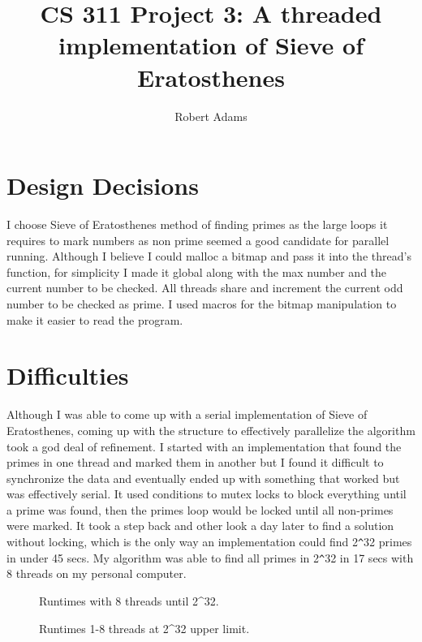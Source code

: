 \documentclass[letterpaper,10pt]{article} %
\begin{document}
  \title{CS 311 Project 3: A threaded implementation of Sieve of Eratosthenes}
  \author{Robert Adams}
\maketitle


\section{Design Decisions}


I choose Sieve of Eratosthenes method of finding primes as the large loops it requires to mark numbers as non prime seemed a good candidate for parallel running.
 Although I believe I could malloc a bitmap and pass it into the thread's function, for simplicity I made it global along with the max number and the current number to be checked.
  All threads share and increment the current odd number to be checked as prime. I used macros for the bitmap manipulation to make it easier to read the program.


\section{Difficulties}


Although I was able to come up with a serial implementation of Sieve of Eratosthenes, coming up with the structure to effectively parallelize the algorithm took a god deal of refinement.  
I started with an implementation that found the primes in one thread and marked them in another but I found it difficult to synchronize the data and eventually ended up with something that worked but was effectively serial.  
It used conditions to mutex locks to block everything until a prime was found, then the primes loop would be locked until all non-primes were marked.  
It took a step back and other look a day later to find a solution without locking, which is the only way an implementation could find 2\verb|^|32 primes in under 45 secs. My algorithm was able to find all primes in 2\verb|^|32 in 17 secs with 8 threads on my personal computer.



  \begin{figure}[p]
    \centering
    
    \caption{Runtimes with 8 threads until 2\textasciicircum32. }
    \label{runtimes}
  \end{figure}

  \begin{figure}[p]
    \centering
    
    \caption{Runtimes 1-8 threads at 2\textasciicircum32 upper limit.}
    \label{runtimes}
  \end{figure}
\end{document}
